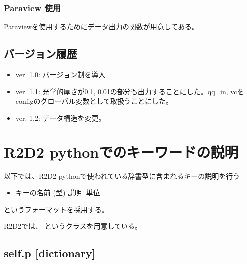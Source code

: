 \documentclass[letterpaper,10pt,dvipdfmx,report]{sphinxmanual}
\begin{document}
\subsection{Paraview 使用}
\label{\detokenize{io:paraview}}
Paraviewを使用するためにデータ出力の関数が用意してある。

\begin{fulllineitems}
\label{\detokenize{io:R2D2.R2D2.vtk.write_3D}}
\end{fulllineitems}



\section{バージョン履歴}
\label{\detokenize{io:id5}}\begin{itemize}
\item {} 
ver. 1.0: バージョン制を導入

\item {} 
ver. 1.1: 光学的厚さが0.1, 0.01の部分も出力することにした。qq\_in, vcをconfigのグローバル変数として取扱うことにした。

\item {} 
ver. 1.2: データ構造を変更。

\end{itemize}


\chapter{R2D2 pythonでのキーワードの説明}
\label{\detokenize{notation:r2d2-python}}\label{\detokenize{notation::doc}}
以下では、R2D2 pythonで使われている辞書型に含まれるキーの説明を行う
\begin{itemize}
\item {} 
キーの名前 (型) \sphinxhyphen{}\sphinxhyphen{} 説明 {[}単位{]}

\end{itemize}

というフォーマットを採用する。

R2D2では、 というクラスを用意している。


\section{self.p {[}dictionary{]}}
\label{\detokenize{notation:self-p-dictionary}}
\begin{sphinxVerbatim}[commandchars=\\\{\}]
 
  
\end{sphinxVerbatim}
\end{document}
